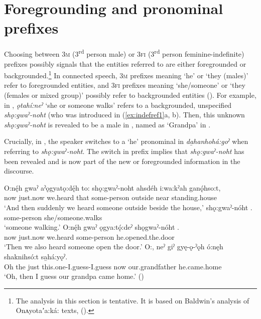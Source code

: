 \section{Foregrounding and pronominal prefixes} \label{ch:Foregrounding and pronominal prefixes}
Choosing between \textsc{3m} (3\textsuperscript{rd} person male) or \textsc{3fi} (3\textsuperscript{rd} person feminine-indefinite) prefixes possibly signals that the entities referred to are either foregrounded or backgrounded.\footnote{The analysis in this section is tentative. It is based on Baldwin’s analysis of Onʌyotaʼa:ká: texts, (\cite{baldwin_indefinite_1997}).} In connected speech, \textsc{3m} prefixes meaning ‘he’ or ‘they (males)’ refer to foregrounded entities, and \textsc{3fi} prefixes meaning ‘she/someone’ or ‘they (females or mixed group)’ possibly refer to backgrounded entities (\cite{baldwin_indefinite_1997}). For example, in , \textit{ǫtahí:neˀ} ‘she or someone walks’ refers to a backgrounded, unspecified \textit{shǫ:gwaˀ-noht} (who was introduced in (\ref{ex:indefref1}a, b). Then, this unknown \textit{shǫ:gwaˀ-noht} is revealed to be a male in , named as ‘Grandpa’ in . 

Crucially, in , the speaker switches to a ‘he’ pronominal in \textit{da̱hanhohá:goˀ} when referring to \textit{shǫ:gwaˀ-noht}. The switch in prefix implies that \textit{shǫ:gwaˀ-noht} has been revealed and is now part of the new or foregrounded information in the discourse. 

\ea\label{ex:indefref1}
\ea\label{ex:indefref1a} 
\gll O:nę́h gwaˀ aˀǫgyatǫ:dę́h to: shǫ:gwaˀ-noht ahsdéh i:wa:kˀah ganǫ́hso:t,\\
now just.now we.heard that some-person outside near standing.house\\
\glt ‘And then suddenly we heard someone outside beside the house,’
\ex \label{ex:indefref1b}
\gll shǫ:gwaˀ-nóht .\\
some-person she/someone.walks\\
\glt ‘someone walking.’
\ex \label{ex:indefref1c}
\gll O:nę́h gwaˀ ǫgya:tǫ́:deˀ shǫgwaˀ-nóht .\\
now just.now we.heard some-person he.opened.the.door\\
\glt ‘Then we also heard someone open the door.’
\ex \label{ex:indefref1d}
\gll O:, neˀ giˀ gyę-ǫ-ˀǫh ó:nęh shaknihsó:t sa̱há:yǫˀ. \\
Oh the just this.one-I.guess-I.guess now our.grandfather he.came.home\\
\glt ‘Oh, then I guess our grandpa came home.’ (\cite{henry_de_2005})
\z
\z 


